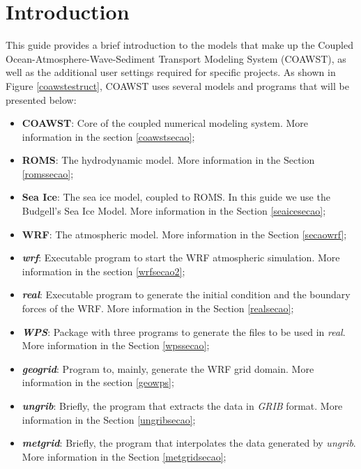 \chapter{Introduction}
\bigskip

\noindent This guide provides a brief introduction to the models that make up the Coupled Ocean-Atmosphere-Wave-Sediment Transport Modeling System
(COAWST), as well as the additional user settings required for specific projects. As shown in Figure \textcolor{bleu_cite} {\ref{coawstestruct}},
COAWST uses several models and programs that will be presented below:


\bigskip

\begin{itemize}
    \item \textbf{COAWST}: Core of the coupled numerical modeling system. More information in the section \textcolor{bleu_cite}{\ref{coawstsecao}};
    \item \textbf{ROMS}: The hydrodynamic model. More information in the Section \textcolor {bleu_cite}{\ref{romssecao}};
    \item \textbf{Sea Ice}: The sea ice model, coupled to ROMS. In this guide we use the Budgell's Sea Ice Model. More information in the Section \textcolor{bleu_cite}{\ref{seaicesecao}};
    \item \textbf{WRF}: The atmospheric model. More information in the Section \textcolor{bleu_cite}{\ref{secaowrf}};
    \item \textit{\textbf{wrf}}: Executable program to start the WRF atmospheric simulation. More information in the section \textcolor{bleu_cite}{\ref{wrfsecao2}};
    \item \textit{\textbf{real}}: Executable program to generate the initial condition and the boundary forces of the WRF. More information in the Section \textcolor{bleu_cite}{\ref{realsecao}};
    \item \textit{\textbf{WPS}}: Package with three programs to generate the files to be used in \textit {real}. More information in the Section \textcolor{bleu_cite}{\ref{wpssecao}};
    \item \textit{\textbf{geogrid}}: Program to, mainly, generate the WRF grid domain. More information in the section \textcolor{bleu_cite}{\ref{geowps}};
    \item \textit{\textbf{ungrib}}: Briefly, the program that extracts the data in \textit{GRIB} format. More information in the Section \textcolor{bleu_cite}{\ref{ungribsecao}};   
    \item \textit{\textbf{metgrid}}: Briefly, the program that interpolates the data generated by \textit {ungrib}. More information in the Section \textcolor{bleu_cite}{\ref {metgridsecao}};    

\end{itemize}

